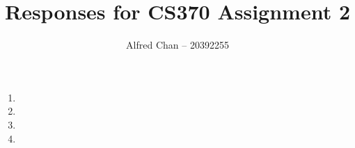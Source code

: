 \documentclass[12pt]{article}
\title{Responses for CS370 Assignment 2}
\author{Alfred Chan -- 20392255}
\begin{document}


\begin{enumerate}
\item
\item
\item
\item
\end{enumerate}
\end{document}

